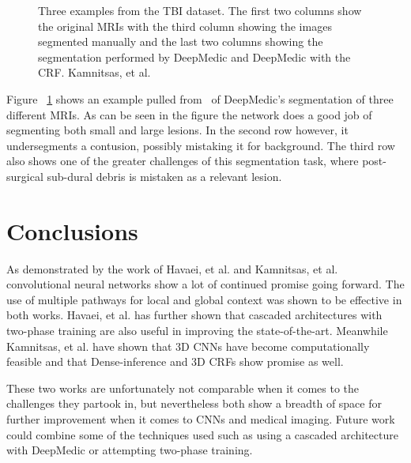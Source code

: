 \documentclass{sig-alternate}
\begin{document}
\begin{figure*}
\centering
{}
\caption{Kamnitsas, et al. best performnce versus previous state-of-the-arts(BRATS 2015). The bold numbers indicate a statistically significant difference made by the CRF.~\cite{Kamnitsas:2017}}
\label{fig:KamnitsasResults}
\end{figure*}

\begin{figure}
\centering
{}
\caption{Three examples from the TBI dataset. The first two columns show the original MRIs with the third column showing the images segmented manually and the last two columns showing the segmentation performed by DeepMedic and DeepMedic with the CRF. Kamnitsas, et al.~\cite{Kamnitsas:2017}}
\label{fig:TBIVisuals}
\end{figure}

Figure ~\ref{fig:TBIVisuals} shows an example pulled from~\cite{Kamnitsas:2017} of DeepMedic's segmentation of three different MRIs. As can be seen in the figure the network does a good job of segmenting both small and large lesions. In the second row however, it undersegments a contusion, possibly mistaking it for background. The third row also shows one of the greater challenges of this segmentation task, where post-surgical sub-dural debris is mistaken as a relevant lesion.~\cite{Kamnitsas:2017}

\section{Conclusions}
\label{sec:conclusions}

As demonstrated by the work of Havaei, et al. and Kamnitsas, et al. convolutional neural networks show a lot of continued promise going forward. The use of multiple pathways for local and global context was shown to be effective in both works. Havaei, et al. has further shown that cascaded architectures with two-phase training are also useful in improving the state-of-the-art. Meanwhile Kamnitsas, et al. have shown that 3D CNNs have become computationally feasible and that Dense-inference and 3D CRFs show promise as well.

These two works are unfortunately not comparable when it comes to the challenges they partook in, but nevertheless both show a breadth of space for further improvement when it comes to CNNs and medical imaging. Future work could combine some of the techniques used such as using a cascaded architecture with DeepMedic or attempting two-phase training.
\end{document}
